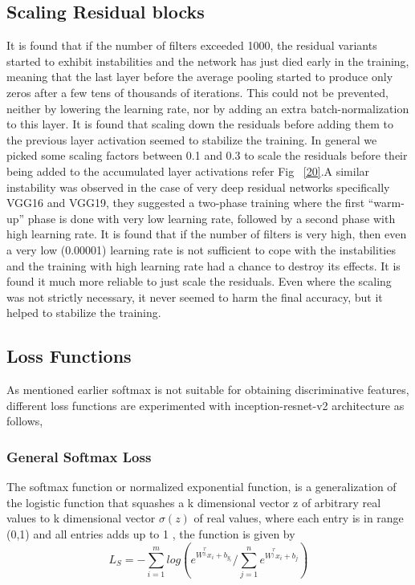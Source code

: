 \documentclass[a4paper,12pt, twoside]{NITKReport}
\begin{document}
\subsection{Scaling Residual blocks}
\par It is found that if the number of filters exceeded 1000, the residual variants started to exhibit instabilities and the network has just died early in the training, meaning that the last layer before the average pooling started to produce only zeros after a few tens of thousands of iterations. This could not be prevented, neither by lowering the learning rate, nor by adding an extra batch-normalization to this layer. It is found that scaling down the residuals before adding them to the previous layer activation seemed to stabilize the
training. In general we picked some scaling factors between 0.1 and 0.3 to scale the residuals before their being added to the accumulated layer activations refer Fig ~\ref{20}.A similar instability was observed in the case of very deep residual networks specifically VGG16 and VGG19, they suggested a two-phase training where the first “warm-up” phase is done with  very  low  learning  rate,  followed  by  a  second  phase with  high  learning  rate. It is found that if the number of filters is very high, then even a very low (0.00001) learning rate is not sufficient to cope with the instabilities and the training with high learning rate had a chance to destroy its effects. It is found it much more reliable to just scale the
residuals. Even  where  the  scaling  was  not  strictly  necessary,  it
never seemed to harm the final accuracy,  but it helped to stabilize the training.

\subsection{Loss Functions}
\par As mentioned earlier softmax is not suitable for obtaining discriminative features, different loss functions are experimented with inception-resnet-v2 architecture as follows,

\subsubsection{General Softmax Loss}
\par  The softmax function or normalized exponential function, is a generalization of the logistic function that squashes a k dimensional vector z of arbitrary real values to k dimensional vector $\sigma (z)$ of real values, where each entry is in range (0,1) and all entries adds up to 1 \cite{100}, the function is given by
\begin{equation}
L_{S} = -\sum_{i=1}^{m}log (e^{W^{_{y_{i}}^{T}}x_{i}+b_{y_{i}}} / \sum_{j=1}^{n} e^{W^{_{j}^{T}}x_{i}+b_{j}})
\end{equation}
\end{document}
